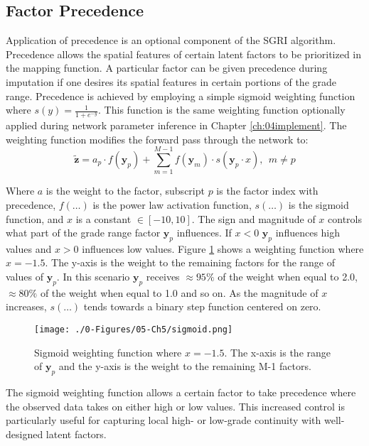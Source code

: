 \subsection{Factor Precedence}
\label{subsec:precedence}

Application of precedence is an optional component of the \gls{SGRI} algorithm. Precedence allows the spatial features of certain latent factors to be prioritized in the mapping function. A particular factor can be given precedence during imputation if one desires its spatial features in certain portions of the grade range. Precedence is achieved by employing a simple sigmoid weighting function where $s(y) = \frac{1}{1+e^{-y}}$. This function is the same weighting function optionally applied during network parameter inference in Chapter \ref{ch:04implement}. The weighting function modifies the forward pass through the network to:
\begin{equation}
    \tilde{\mathbf{z}} = a_{p} \cdot f(\mathbf{y}_{p}) + \sum_{m=1}^{M-1} f(\mathbf{y}_{m}) \cdot s(\mathbf{y}_{p} \cdot x), \ \ m \neq p
    \label{eq:wtpass}
\end{equation}

Where $a$ is the weight to the factor, subscript $p$ is the factor index with precedence, $f(\dots)$ is the power law activation function, $s(\dots)$ is the sigmoid function, and $x$ is a constant $\in [-10, 10]$. The sign and magnitude of $x$ controls what part of the grade range factor $\mathbf{y}_{p}$ influences. If $x<0$ $\mathbf{y}_{p}$ influences high values and $x>0$ influences low values. Figure \ref{fig:sigmoid} shows a weighting function where $x=-1.5$. The y-axis is the weight to the remaining factors for the range of values of $\mathbf{y}_{p}$. In this scenario $\mathbf{y}_{p}$ receives $\approx 95\%$ of the weight when equal to 2.0, $\approx 80\%$ of the weight when equal to 1.0 and so on. As the magnitude of $x$ increases, $s(\dots)$ tends towards a binary step function centered on zero.

\begin{figure}[htb!]
    \centering
    \texttt{[image: ./0-Figures/05-Ch5/sigmoid.png]}
    \caption{Sigmoid weighting function where $x=-1.5$. The x-axis is the range of $\mathbf{y}_{p}$ and the y-axis is the weight to the remaining M-1 factors. }
    \label{fig:sigmoid}
\end{figure}

The sigmoid weighting function allows a certain factor to take precedence where the observed data takes on either high or low values. This increased control is particularly useful for capturing local high- or low-grade continuity with well-designed latent factors.

